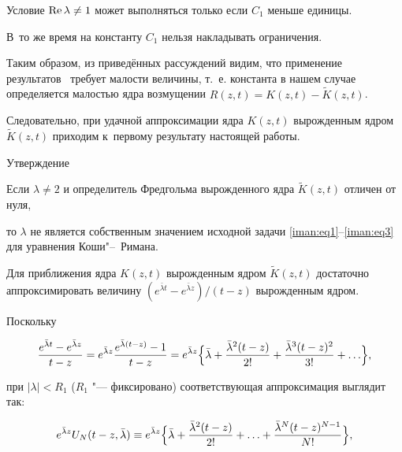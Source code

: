 Условие $\mathop{\rm Re} \lambda  \ne 1$ может выполняться только если $C_1$ меньше единицы. 

В~то же время на константу $C_1 $ нельзя накладывать ограничения. 

Таким образом, из приведённых рассуждений видим, что применение результатов~\cite{iman:bib15} требует малости величины, т.~е. константа в нашем случае определяется малостью ядра возмущении $R(z,t) = K(z,t) - \tilde K(z,t)$.



Следовательно, при удачной аппроксимации ядра $K(z,t)$ вырожденным ядром $\tilde K(z,t)$ приходим к~первому результату настоящей работы.



\smallskip



\begin{newthm}{Утверждение}

Если $\lambda  \ne 2$  и определитель Фредгольма вырожденного ядра $\tilde K(z,t)$ отличен от нуля,

то $\lambda $ не является собственным значением исходной задачи \eqref{iman:eq1}--\eqref{iman:eq3} для уравнения Коши"--~Римана.

\end{newthm}



\smallskip



Для приближения ядра $K(z,t)$ вырожденным ядром $\tilde K(z,t)$ достаточно аппроксимировать величину $({e^{\bar \lambda t}-e^{\bar \lambda z} })/({t - z})$ вырожденным ядром. 

Поскольку

\[

\frac{e^{\bar \lambda t}  - e^{\bar \lambda z}}{t - z} = e^{\bar \lambda z} \frac{e^{\bar \lambda (t - z)}  - 1}{t - z} = e^{\bar \lambda z} \Bigl\{ \bar \lambda  + \frac{\bar \lambda ^2 (t - z)}{2!} + \frac{\bar \lambda ^3 (t - z)^2 }{3!} +  \ldots  \Bigr\},

\]

при  $|\lambda | < R_1$ ($R_1 $ "--- фиксировано) соответствующая аппроксимация выглядит так:

\[

e^{\bar \lambda z} U_N (t - z,\bar \lambda ) \equiv e^{\bar \lambda z} \Bigl\{ \bar \lambda  + \frac{\bar \lambda^2 (t - z)}{2!} +  \ldots  + \frac{\bar \lambda ^N (t - z)^{N - 1} }{N!}\Bigr\},

\]

